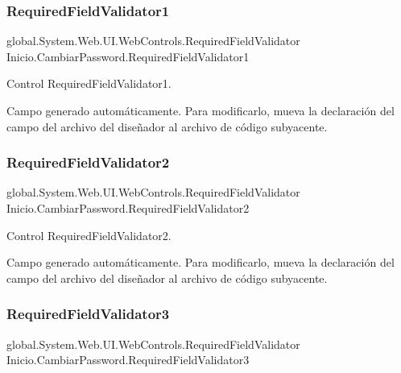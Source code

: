 \subsubsection{\texorpdfstring{RequiredFieldValidator1}{RequiredFieldValidator1}}
{\footnotesize\ttfamily global.\+System.\+Web.\+U\+I.\+Web\+Controls.\+Required\+Field\+Validator Inicio.\+Cambiar\+Password.\+Required\+Field\+Validator1\hspace{0.3cm}{\ttfamily [protected]}}



Control Required\+Field\+Validator1. 

Campo generado automáticamente. Para modificarlo, mueva la declaración del campo del archivo del diseñador al archivo de código subyacente. \mbox{\label{classInicio_1_1CambiarPassword_a955b645fae496e6d030ac5da64663fc7}} 
\subsubsection{\texorpdfstring{RequiredFieldValidator2}{RequiredFieldValidator2}}
{\footnotesize\ttfamily global.\+System.\+Web.\+U\+I.\+Web\+Controls.\+Required\+Field\+Validator Inicio.\+Cambiar\+Password.\+Required\+Field\+Validator2\hspace{0.3cm}{\ttfamily [protected]}}



Control Required\+Field\+Validator2. 

Campo generado automáticamente. Para modificarlo, mueva la declaración del campo del archivo del diseñador al archivo de código subyacente. \mbox{\label{classInicio_1_1CambiarPassword_a618ca28dc9312f747d6f48cc9b11f132}} 
\subsubsection{\texorpdfstring{RequiredFieldValidator3}{RequiredFieldValidator3}}
{\footnotesize\ttfamily global.\+System.\+Web.\+U\+I.\+Web\+Controls.\+Required\+Field\+Validator Inicio.\+Cambiar\+Password.\+Required\+Field\+Validator3\hspace{0.3cm}{\ttfamily [protected]}}



